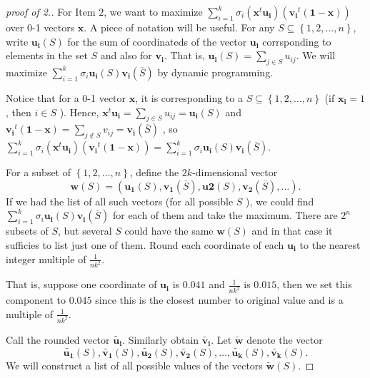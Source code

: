 \begin{proof}[proof of 2.]   
  For Item \(2\), we want to maximize \(\sum_{i=1}^k \sigma _i \left( \mathbf{x} ^t \mathbf{u_i}  \right) \left( \mathbf{v_i}^t (\mathbf{1} - \mathbf{x}  )  \right)   \) over 0-1 vectors \(\mathbf{x} \).   A piece of notation will be useful. For any \(S \subseteq \left\{ 1,2,\dots ,n \right\} \), write \(\mathbf{u_i}(S) \) for the sum of coordinateds of the vector \(\mathbf{u_i} \) corrsponding to elements in the set \(S\) and also for \(\mathbf{v_i} \).        That is, \(\mathbf{u_i}(S) = \sum_{j \in S} u_{ij}\). We will maximize \(\sum_{i=1}^k \sigma _i \mathbf{u_i}(S) \mathbf{v_i}(\overline{S} )   \) by dynamic programming.  

  \begin{note}
    Notice that for a 0-1 vector \(\mathbf{x} \), it is corresponding to a \(S \subseteq \left\{ 1,2,\dots ,n \right\} \) (if \(\mathbf{x_i} = 1\), then \(i \in S\)  ).  Hence, \(\mathbf{x} ^t \mathbf{u_i} = \sum_{j \in S} u_{ij} = \mathbf{u_i}(S) \) and \(\mathbf{v_i}^t ( \mathbf{1} - \mathbf{x}) = \sum_{j \notin S} v_{ij} = \mathbf{v_i}(\overline{S} )\) , so \(\sum_{i=1}^k \sigma _i \left( \mathbf{x} ^t \mathbf{u_i}  \right) \left( \mathbf{v_i}^t (\mathbf{1} - \mathbf{x}  )  \right)  = \sum_{i=1}^k \sigma _i \mathbf{u_i}(S) \mathbf{v_i}(\overline{S} )   \).     
  \end{note}

  For a subset of \(\left\{ 1,2, \dots , n \right\} \), define the \(2k\)-dimensional vector
  \[
    \mathbf{w} (S) =  \left(     \mathbf{u_1}(S),  \mathbf{v_1}(\overline{S} ) , \mathbf{u2} (S)  , \mathbf{v_2}(\overline{S} ) ,\dots  \right).
  \] If we had the list of all such vectors (for all possible \(S\) ), we could find \(\sum_{i=1}^k \sigma _i \mathbf{u_i}(S) \mathbf{v_i}(\overline{S}) \) for each of them and take the maximum. There are \(2^n\) subsets of \(S\), but several \(S\) could have the same \(\mathbf{w} (S)\) and in that case it sufficies to list just one of them. Round each coordinate of each \(\mathbf{u_i} \) to the nearest integer multiple of \(\frac{1}{nk^2}\).
  
  \begin{note}
    That is, suppose one coordinate of \(\mathbf{u_i} \) is \(0.041\) and \(\frac{1}{nk^2}\) is \(0.015\), then we set this component to \(0.045\) since this is the closest number to original value and is a multiple of \(\frac{1}{nk^2}\).      
  \end{note}
  
  Call the rounded vector \(\widetilde{\mathbf{u_i} } \). Similarly obtain \(\widetilde{\mathbf{v_i} } \). Let  \(\widetilde{\mathbf{w} } \) denote the vector 
  \[
    \widetilde{\mathbf{u_1} }(S), \widetilde{\mathbf{v_1} }(S), \widetilde{\mathbf{u_2} } (S), \widetilde{\mathbf{v_2} }(S), \dots , \widetilde{\mathbf{u_k} }(S), \widetilde{\mathbf{v_k} }(S).     
  \]     We will construct a list of all possible values of the vectors \(\widetilde{\mathbf{w} }(S) \). 


\end{proof}
